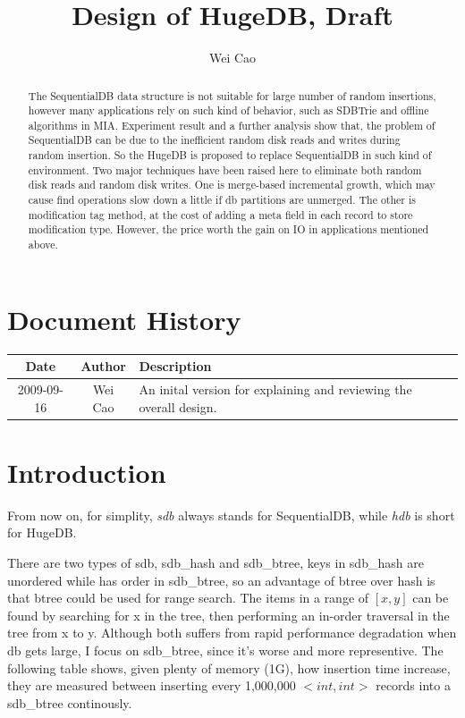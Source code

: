 \documentclass[a4paper,10pt]{article}
\begin{document}

\title{Design of HugeDB, Draft}
\author{Wei Cao}
\maketitle

\begin{abstract}
The SequentialDB data structure is not suitable for large number of random insertions, however many applications rely on such kind of behavior, such as SDBTrie and offline algorithms in MIA.
Experiment result and a further analysis show that, the problem of SequentialDB can be due to the inefficient random disk reads and writes during random insertion.
So the HugeDB is proposed to replace SequentialDB in such kind of environment. Two major techniques have been raised here to eliminate both random disk reads and random disk writes.
One is merge-based incremental growth, which may cause find operations slow down a little if db partitions are unmerged.
The other is modification tag method, at the cost of adding a meta field in each record to store modification type.
However, the price worth the gain on IO in applications mentioned above.
\end{abstract}

\tableofcontents

\section{Document History}
\begin{center}
\begin{tabular}{|c|c|p{7cm}|}
    \hline
    Date & Author & Description \\ \hline
    2009-09-16& Wei Cao & An inital version for explaining and reviewing the overall design. \\ \hline
\end{tabular}
\end{center}

\section{Introduction}
From now on, for simplity, \emph{sdb} always stands for SequentialDB, while \emph{hdb} is short for HugeDB.

There are two types of sdb, sdb\_hash and sdb\_btree, keys in sdb\_hash are unordered while has order in sdb\_btree, so an advantage of btree over hash is that btree could be used for range search.
The items in a range of $[x,y]$ can be found by searching for x in the tree, then performing an in-order traversal in the tree from x to y.
Although both suffers from rapid performance degradation when db gets large, I focus on sdb\_btree, since it's worse and more representive.
The following table shows, given plenty of memory (1G), how insertion time increase, they are measured between inserting every 1,000,000 $<int, int>$ records into a sdb\_btree continously.
\end{document}
